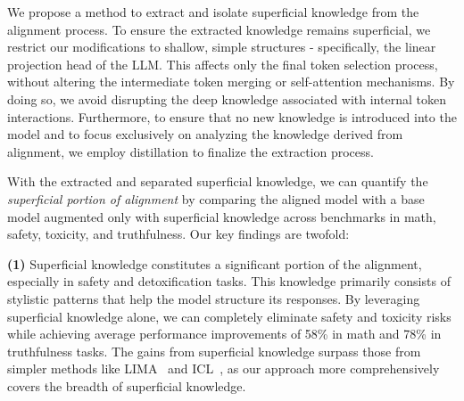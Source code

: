 

We propose a method to extract and isolate superficial knowledge from the alignment process. To ensure the extracted knowledge remains superficial, we restrict our modifications to shallow, simple structures - specifically, the linear projection head of the LLM. This affects only the final token selection process, without altering the intermediate token merging or self-attention mechanisms. By doing so, we avoid disrupting the deep knowledge associated with internal token interactions. Furthermore, to ensure that no new knowledge is introduced into the model and to focus exclusively on analyzing the knowledge derived from alignment, we employ distillation to finalize the extraction process.


With the extracted and separated superficial knowledge, we can quantify the \emph{superficial portion of alignment} by comparing the aligned model with a base model augmented only with superficial knowledge across benchmarks in math, safety, toxicity, and truthfulness. Our key findings are twofold:



\textbf{(1)} Superficial knowledge constitutes a significant portion of the alignment, especially in safety and detoxification tasks. This knowledge primarily consists of stylistic patterns that help the model structure its responses. By leveraging superficial knowledge alone, we can completely eliminate safety and toxicity risks while achieving average performance improvements of 58\% in math and 78\% in truthfulness tasks. The gains from superficial knowledge surpass those from simpler methods like LIMA~\citep{lima} and ICL~\citep{urial}, as our approach more comprehensively covers the breadth of superficial knowledge.



